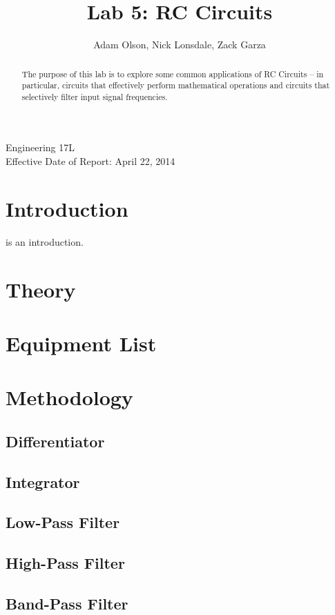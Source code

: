 \documentclass[twocolumn,english]{IEEEtran}
\theoremstyle{plain}
\theoremstyle{plain}
\begin{document}
\title{Lab 5: RC Circuits}


\author{Adam Olson, Nick Lonsdale, Zack Garza}


\IEEEspecialpapernotice
{Engineering 17L \\
Effective Date of Report: April 22, 2014}


\maketitle
\begin{abstract}
The purpose of this lab is to explore some common applications of RC Circuits -- in particular, circuits that effectively perform mathematical operations and circuits that selectively filter input signal frequencies.
\end{abstract}
\tableofcontents

\section{Introduction}
 is an introduction.

\section{Theory}

\section{Equipment List}
\section{Methodology}
	\subsection{Differentiator}
	\subsection{Integrator}
	\subsection{Low-Pass Filter}
	\subsection{High-Pass Filter}
	\subsection{Band-Pass Filter}
\end{document}
